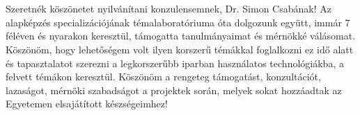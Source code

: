 \chapter*{\koszonetnyilvanitas}

Szeretnék köszönetet nyilvánítani konzulensemnek, Dr. Simon Csabának! Az alapképzés specializációjának témalaboratóriuma óta dolgozunk együtt, immár 7 féléven és nyarakon keresztül, támogatta tanulmányaimat és mérnökké válásomat. Köszönöm, hogy lehetőségem volt ilyen korszerű témákkal foglalkozni ez idő alatt és tapasztalatot szerezni a legkorszerűbb iparban használatos technológiákba, a felvett témákon keresztül. Köszönöm a rengeteg támogatást, konzultációt, lazaságot, mérnöki szabadságot a projektek során, melyek sokat hozzáadtak az Egyetemen elsajátított készségeimhez!